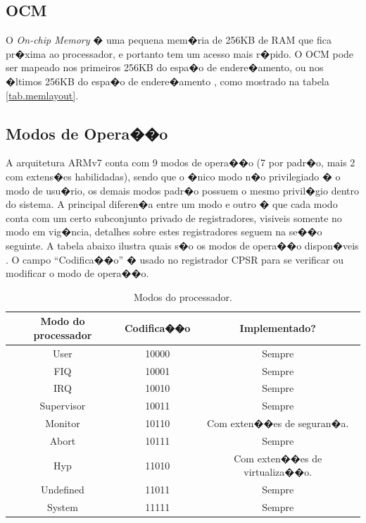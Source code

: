 \documentclass{ufscThesis/ufscThesis} %
\begin{document}
\subsection{OCM} O \emph{On-chip Memory} � uma pequena mem�ria de 256KB de RAM que fica pr�xima ao processador, e portanto tem um acesso mais r�pido. O OCM pode ser mapeado nos primeiros 256KB do espa�o de endere�amento, ou nos �ltimos 256KB do espa�o de endere�amento \cite{ug585}, como mostrado na tabela \ref{tab.memlayout}.


\subsection{Modos de Opera��o}
\label{sec:operating_modes}
A arquitetura ARMv7 conta com 9 modos de opera��o (7 por padr�o, mais 2 com extens�es habilidadas), sendo que o �nico modo n�o privilegiado � o modo de usu�rio, os demais modos padr�o possuem o mesmo privil�gio dentro do sistema. A principal diferen�a entre um modo e outro � que cada modo conta com um certo subconjunto privado de registradores, visiveis somente no modo em vig�ncia, detalhes sobre estes registradores seguem na se��o seguinte. A tabela abaixo ilustra quais s�o os modos de opera��o dispon�veis \cite[p.~1139]{armarm}.
O campo ``Codifica��o'' � usado no registrador CPSR para se verificar ou modificar o modo de opera��o.

\begin{table}[ht]
\centering
\begin{tabular}{ccc}
\hline\hline                        %
Modo do processador  & Codifica��o & Implementado?\\ [0.5ex] %
\hline                  %
User & 10000 & Sempre \\
FIQ & 10001 & Sempre \\
IRQ & 10010 & Sempre \\
Supervisor & 10011 & Sempre\\
Monitor & 10110 & Com exten��es de seguran�a.\\
Abort & 10111 & Sempre\\
Hyp & 11010 & Com exten��es de virtualiza��o.\\
Undefined & 11011 & Sempre\\
System & 11111 & Sempre\\[1ex]
\hline %
\end{tabular}
\caption{Modos do processador.}
\label{tab.processormode} %
\end{table}
\end{document}
